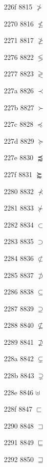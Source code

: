 \documentclass[11pt]{article}
\begin{document}
226f 8815 \ensuremath{\ngtr}

2270 8816 \ensuremath{\nleq}

2271 8817 \ensuremath{\ngeq}





2276 8822 \ensuremath{\lessgtr}

2277 8823 \ensuremath{\gtrless}



227a 8826 \ensuremath{\prec}

227b 8827 \ensuremath{\succ}

227c 8828 \ensuremath{\preccurlyeq}

227d 8829 \ensuremath{\succcurlyeq}

227e 8830 \ensuremath{\precapprox}

227f 8831 \ensuremath{\succapprox}

2280 8832 \ensuremath{\nprec}

2281 8833 \ensuremath{\nsucc}

2282 8834 \ensuremath{\subset}

2283 8835 \ensuremath{\supset}

2284 8836 \ensuremath{\nsubset}

2285 8837 \ensuremath{\nsupset}

2286 8838 \ensuremath{\subseteq}

2287 8839 \ensuremath{\supseteq}

2288 8840 \ensuremath{\nsubseteq}

2289 8841 \ensuremath{\nsupseteq}

228a 8842 \ensuremath{\subsetneq}

228b 8843 \ensuremath{\supsetneq}


228e 8846 \ensuremath{\uplus}

228f 8847 \ensuremath{\sqsubset}

2290 8848 \ensuremath{\sqsupset}

2291 8849 \ensuremath{\sqsubseteq}

2292 8850 \ensuremath{\sqsupseteq}
\end{document}
